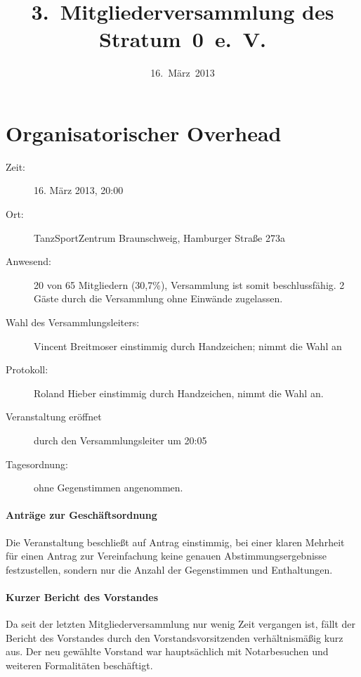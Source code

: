 \documentclass[a4paper,12pt]{scrartcl}
\title{3.~Mitgliederversammlung des Stratum~0~e.~V.}
\date{16.~März~2013}
\begin{document}
\maketitle
{\footnotesize\tableofcontents}

\section{Organisatorischer Overhead}
\begin{description}
  \item[Zeit:] 16. März 2013, 20:00
  \item[Ort:] TanzSportZentrum Braunschweig, Hamburger Straße 273a
  \item[Anwesend:] 20 von 65 Mitgliedern (30{,}7\%), Versammlung ist somit
  beschlussfähig. 2 Gäste durch die Versammlung ohne Einwände zugelassen.
  \item[Wahl des Versammlungsleiters:] Vincent Breitmoser einstimmig durch
    Handzeichen; nimmt die Wahl an
  \item[Protokoll:] Roland Hieber einstimmig durch Handzeichen, nimmt die Wahl
    an.
  \item[Veranstaltung eröffnet] durch den Versammlungsleiter um 20:05
	\item[Tagesordnung:] ohne Gegenstimmen angenommen.
\end{description}

\paragraph{Anträge zur Geschäftsordnung}
Die Veranstaltung beschließt auf Antrag einstimmig, bei einer klaren Mehrheit
für einen Antrag zur Vereinfachung keine genauen Abstimmungsergebnisse
festzustellen, sondern nur die Anzahl der Gegenstimmen und Enthaltungen.

\paragraph{Kurzer Bericht des Vorstandes}
Da seit der letzten Mitgliederversammlung nur wenig Zeit vergangen ist, fällt
der Bericht des Vorstandes durch den Vorstandsvorsitzenden verhältnismäßig kurz
aus. Der neu gewählte Vorstand war hauptsächlich mit Notarbesuchen und weiteren
Formalitäten beschäftigt.


\end{document}
